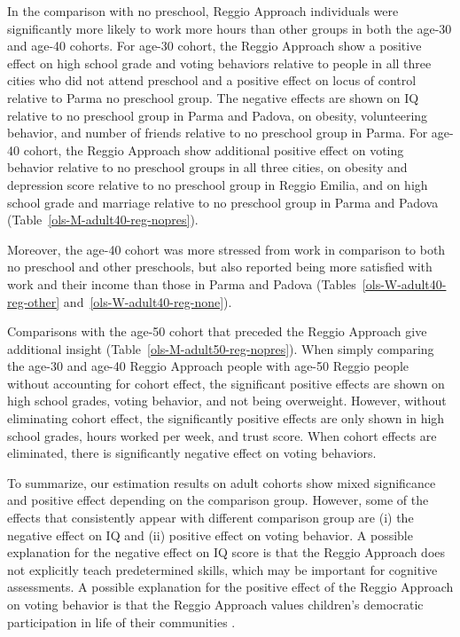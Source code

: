 In the comparison with no preschool, Reggio Approach individuals were significantly more likely to work more hours than other groups in both the age-30 and age-40 cohorts. For age-30 cohort, the Reggio Approach show a positive effect on high school grade and voting behaviors relative to people in all three cities who did not attend preschool and a positive effect on locus of control relative to Parma no preschool group. The negative effects are shown on IQ relative to no preschool group in Parma and Padova, on obesity, volunteering behavior, and number of friends relative to no preschool group in Parma. For age-40 cohort, the Reggio Approach show additional positive effect on voting behavior relative to no preschool groups in all three cities, on obesity and depression score relative to no preschool group in Reggio Emilia, and on high school grade and marriage relative to no preschool group in Parma and Padova (Table~\ref{ols-M-adult40-reg-nopres}).

Moreover, the age-40 cohort was more stressed from work in comparison to both no preschool and other preschools, but also reported being more satisfied with work and their income than those in Parma and Padova (Tables~\ref{ols-W-adult40-reg-other} and~\ref{ols-W-adult40-reg-none}). 

Comparisons with the age-50 cohort that preceded the Reggio Approach give additional insight (Table~\ref{ols-M-adult50-reg-nopres}). When simply comparing the age-30 and age-40 Reggio Approach people with age-50 Reggio people without accounting for cohort effect, the significant positive effects are shown on high school grades, voting behavior, and not being overweight. However, without eliminating cohort effect, the significantly positive effects are only shown in high school grades, hours worked per week, and trust score. When cohort effects are eliminated, there is significantly negative effect on voting behaviors. 

To summarize, our estimation results on adult cohorts show mixed significance and positive effect depending on the comparison group. However, some of the effects that consistently appear with different comparison group are (i) the negative effect on IQ and (ii) positive effect on voting behavior. A possible explanation for the negative effect on IQ score is that the Reggio Approach does not explicitly teach predetermined skills, which may be important for cognitive assessments\citep{Cagliari-etal-eds_2016_BOOK_Loris-Malaguzzi}. A possible explanation for the positive effect of the Reggio Approach on voting behavior is that the Reggio Approach values children's democratic participation in life of their communities \citep{Lazzari_2012_Euro-J-Edu}. 

